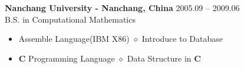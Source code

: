 \documentclass[10pt]{article}
\newcommand{\college}[5]{
    \textbf{#1 #2} \hfill #3 \\ #4 \\ #5
}
\begin{document}
\vspace*{5pt}

\college{Nanchang University}{- Nanchang, China} {2005.09 -- 2009.06}
{B.S. in Computational Mathematics}
{
\begin{itemize}
  \setlength{\itemsep}{0pt}
  \setlength{\parsep}{0pt}
  \setlength{\parskip}{0pt}
  \item {Assemble Language(IBM X86) $\diamond$ Introduce to Database}
  \item {\textbf{C} Programming Language $\diamond$ Data Structure in \textbf{C}}
\end{itemize}
}

\end{document}
